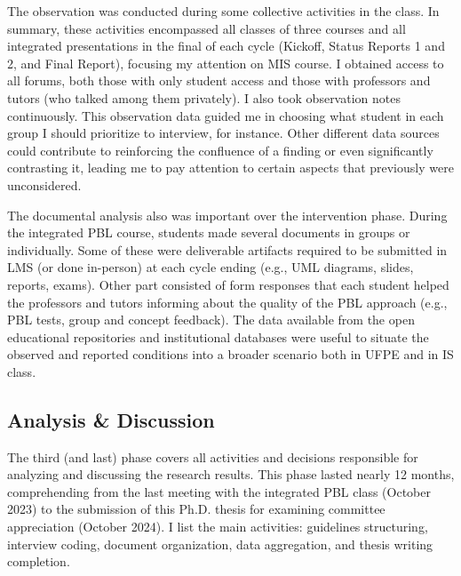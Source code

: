 The observation was conducted during some collective activities in the class. In summary, these activities encompassed all classes of three courses and all integrated presentations in the final of each cycle (Kickoff, Status Reports 1 and 2, and Final Report), focusing my attention on \gls{MIS} course. I obtained access to all forums, both those with only student access and those with professors and tutors (who talked among them privately). I also took observation notes continuously. This observation data guided me in choosing what student in each group I should prioritize to interview, for instance. Other different data sources could contribute to reinforcing the confluence of a finding or even significantly contrasting it, leading me to pay attention to certain aspects that previously were unconsidered. 

The documental analysis also was important over the intervention phase. During the integrated \gls{PBL} course, students made several documents in groups or individually. Some of these were deliverable artifacts required to be submitted in \gls{LMS} (or done in-person) at each cycle ending (e.g., \gls{UML} diagrams, slides, reports, exams). Other part consisted of form responses that each student helped the professors and tutors informing about the quality of the \gls{PBL} approach (e.g., \gls{PBL} tests, group and concept feedback). The data available from the open educational repositories and institutional databases were useful to situate the observed and reported conditions into a broader scenario both in \gls{UFPE} and in \gls{IS} class.%



\subsection{Analysis \& Discussion}
\label{phd-route-ss:ana-dis}

The third (and last) phase covers all activities and decisions responsible for analyzing and discussing the research results. This phase lasted nearly 12 months, comprehending from the last meeting with the integrated \gls{PBL} class (October 2023) to the submission of this \gls{Ph.D.} thesis for examining committee appreciation (October 2024). I list the main activities: guidelines structuring, interview coding, document organization, data aggregation, and thesis writing completion.

